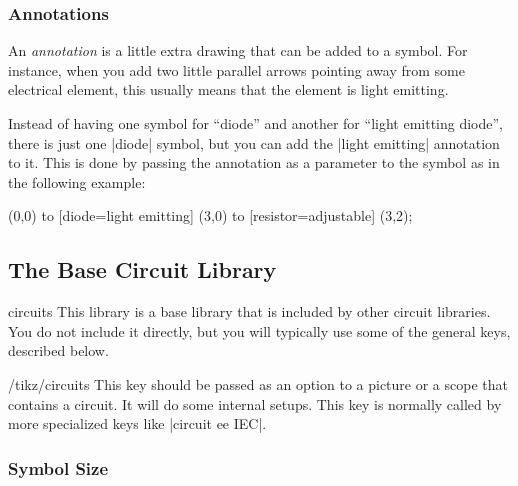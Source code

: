 \subsubsection{Annotations}

An \emph{annotation} is a little extra drawing that can be added to a symbol.
For instance, when you add two little parallel arrows pointing away from some
electrical element, this usually means that the element is light emitting.

Instead of having one symbol for ``diode'' and another for ``light emitting
diode'', there is just one |diode| symbol, but you can add the |light emitting|
annotation to it. This is done by passing the annotation as a parameter to the
symbol as in the following example:
%
\begin{codeexample}[preamble={\usetikzlibrary{circuits.ee.IEC}}]
  \draw (0,0) to [diode={light emitting}] (3,0)
              to [resistor={adjustable}]  (3,2);
\end{codeexample}


\subsection{The Base Circuit Library}

\begin{tikzlibrary}{circuits}
    This library is a base library that is included by other circuit libraries.
    You do not include it directly, but you will typically use some of the
    general keys, described below.
\end{tikzlibrary}

\begin{key}{/tikz/circuits}
  This key should be passed as an option to a picture or a scope that contains
  a circuit. It will do some internal setups. This key is normally called by
  more specialized keys like |circuit ee IEC|.
\end{key}


\subsubsection{Symbol Size}

